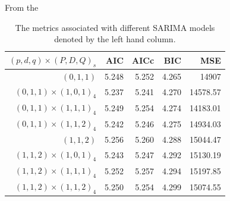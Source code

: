 \documentclass{paper}
\begin{document}
From the 
\begin{table}
\centering
\begin{tabular}{r || r | r| r| r}
$(p, d, q) \times(P, D, Q)_s$   & AIC   &AICc   &BIC    &MSE\\
\hline
$(0, 1, 1)$               & 5.248 &5.252  &4.265  &14907\\
$(0, 1, 1) \times (1, 0, 1)_4$   & 5.237 &5.241  &4.270  &14578.57\\ %
$(0, 1, 1) \times (1, 1, 1)_4$   & 5.249 &5.254  &4.274  &14183.01\\
$(0, 1, 1) \times (1, 1, 2)_4$   & 5.242 &5.246  &4.275  &14934.03\\
\hline
$(1, 1, 2)$               & 5.256 & 5.260 &4.288  &15044.47\\
$(1, 1, 2) \times (1, 0, 1)_4$   & 5.243 &5.247  &4.292  &15130.19\\ %
$(1, 1, 2) \times (1, 1, 1)_4$   & 5.252 & 5.257 &4.294  &15197.85\\
$(1, 1, 2)\times (1, 1, 2)_4$   & 5.250 & 5.254 & 4.299 &15074.55
\end{tabular}
\caption{The metrics associated with different SARIMA models denoted by the left hand column.}
\end{table}

\end{document}
